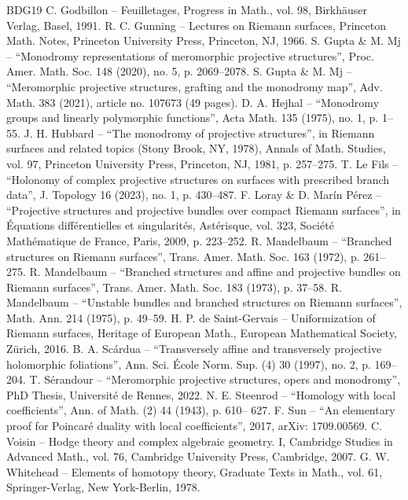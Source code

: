 \documentclass[10pt]{amsart}
\theoremstyle{definition}
\theoremstyle{plain}
\begin{document}
\begin{thebibliography}{BDG19}
 C. Godbillon – Feuilletages, Progress in Math., vol. 98, Birkhäuser Verlag, Basel, 1991.
 R. C. Gunning – Lectures on Riemann surfaces, Princeton Math. Notes, Princeton University Press, Princeton, NJ, 1966.
 S. Gupta \& M. Mj – “Monodromy representations of meromorphic projective structures”, Proc. Amer. Math. Soc. 148 (2020), no. 5, p. 2069–2078.
 S. Gupta \& M. Mj – “Meromorphic projective structures, grafting and the monodromy map”, Adv. Math. 383 (2021), article no. 107673 (49 pages).
 D. A. Hejhal – “Monodromy groups and linearly polymorphic functions”, Acta Math. 135 (1975), no. 1, p. 1–55.
 J. H. Hubbard – “The monodromy of projective structures”, in Riemann surfaces and related topics (Stony Brook, NY, 1978), Annals of Math. Studies, vol. 97, Princeton University Press, Princeton, NJ, 1981, p. 257–275.
 T. Le Fils – “Holonomy of complex projective structures on surfaces with prescribed branch data”, J. Topology 16 (2023), no. 1, p. 430–487.
 F. Loray \& D. Marín Pérez – “Projective structures and projective bundles over compact Riemann surfaces”, in Équations différentielles et singularités, Astérisque, vol. 323, Société Mathématique de France, Paris, 2009, p. 223–252.
 R. Mandelbaum – “Branched structures on Riemann surfaces”, Trans. Amer. Math. Soc. 163 (1972), p. 261–275.
 R. Mandelbaum – “Branched structures and affine and projective bundles on Riemann surfaces”, Trans. Amer. Math. Soc. 183 (1973), p. 37–58.
 R. Mandelbaum – “Unstable bundles and branched structures on Riemann surfaces”, Math. Ann. 214 (1975), p. 49–59.
 H. P. de Saint-Gervais – Uniformization of Riemann surfaces, Heritage of European Math., European Mathematical Society, Zürich, 2016.
 B. A. Scárdua – “Transversely affine and transversely projective holomorphic foliations”, Ann. Sci. École Norm. Sup. (4) 30 (1997), no. 2, p. 169–204.
 T. Sérandour – “Meromorphic projective structures, opers and monodromy”, PhD Thesis, Université de Rennes, 2022.
 N. E. Steenrod – “Homology with local coefficients”, Ann. of Math. (2) 44 (1943), p. 610– 627.
 F. Sun – “An elementary proof for Poincaré duality with local coefficients”, 2017, arXiv: 1709.00569.
 C. Voisin – Hodge theory and complex algebraic geometry. I, Cambridge Studies in Advanced Math., vol. 76, Cambridge University Press, Cambridge, 2007.
 G. W. Whitehead – Elements of homotopy theory, Graduate Texts in Math., vol. 61, Springer-Verlag, New York-Berlin, 1978.
\end{thebibliography}
\end{document}

